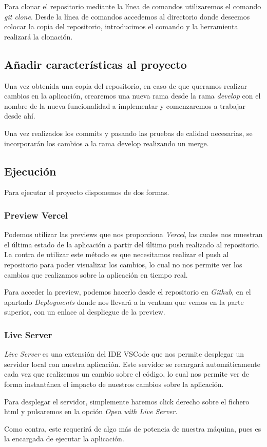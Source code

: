 Para clonar el repositorio mediante la línea de comandos utilizaremos el comando \emph{git clone}. Desde la línea de comandos accedemos al directorio donde deseemos colocar la copia del repositorio, introducimos el comando y la herramienta realizará la clonación.

\subsection{Añadir características al proyecto}
Una vez obtenida una copia del repositorio, en caso de que queramos realizar cambios en la aplicación, crearemos una nueva rama desde la rama \emph{develop} con el nombre de la nueva funcionalidad a implementar y comenzaremos a trabajar desde ahí.

Una vez realizados los commits y pasando las pruebas de calidad necesarias, se incorporarán los cambios a la rama develop realizando un merge.

\subsection{Ejecución}

Para ejecutar el proyecto disponemos de dos formas.

\subsubsection{Preview Vercel}

Podemos utilizar las previews que nos proporciona \emph{Vercel}, las cuales nos muestran el última estado de la aplicación a partir del último push realizado al repositorio. La contra de utilizar este método es que necesitamos realizar el push al repositorio para poder visualizar los cambios, lo cual no nos permite ver los cambios que realizamos sobre la aplicación en tiempo real.


Para acceder la preview, podemos hacerlo desde el repositorio en \emph{Github}, en el apartado \emph{Deployments} donde nos llevará a la ventana que vemos en la parte superior, con un enlace al despliegue de la preview.

\subsubsection{Live Server}


\emph{Live Server} es una extensión del IDE VSCode que nos permite desplegar un servidor local con nuestra aplicación. Este servidor se recargará automáticamente cada vez que realizemos un cambio sobre el código, lo cual nos permite ver de forma instantánea el impacto de nuestros cambios sobre la aplicación.

Para desplegar el servidor, simplemente haremos click derecho sobre el fichero html y pulsaremos en la opción \textit{Open with Live Server}.

Como contra, este requerirá de algo más de potencia de nuestra máquina, pues es la encargada de ejecutar la aplicación.